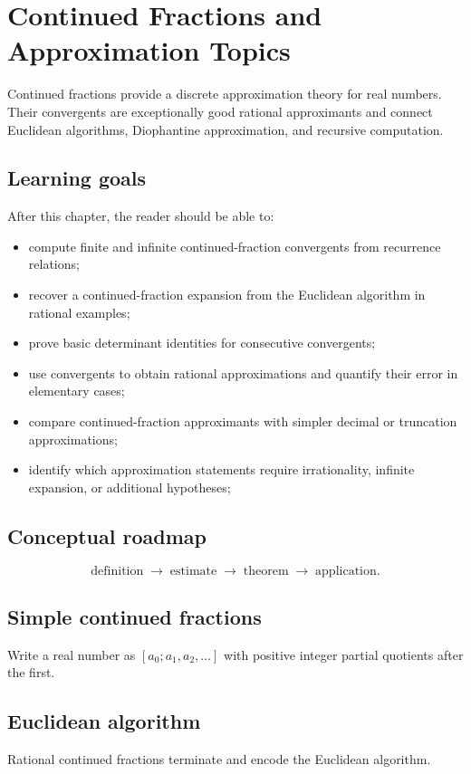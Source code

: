 \chapter{Continued Fractions and Approximation Topics}
\label{ch:ii25}

Continued fractions provide a discrete approximation theory for real numbers. Their convergents are exceptionally good rational approximants and connect Euclidean algorithms, Diophantine approximation, and recursive computation.

\section*{Learning goals}
After this chapter, the reader should be able to:
\begin{itemize}
\item compute finite and infinite continued-fraction convergents from recurrence relations;
\item recover a continued-fraction expansion from the Euclidean algorithm in rational examples;
\item prove basic determinant identities for consecutive convergents;
\item use convergents to obtain rational approximations and quantify their error in elementary cases;
\item compare continued-fraction approximants with simpler decimal or truncation approximations;
\item identify which approximation statements require irrationality, infinite expansion, or additional hypotheses;
\end{itemize}
\section*{Conceptual roadmap}
\[
\boxed{\text{definition}\;\longrightarrow\;\text{estimate}\;\longrightarrow\;\text{theorem}\;\longrightarrow\;\text{application}.}
\]

\section{Simple continued fractions}
Write a real number as $[a_0;a_1,a_2,\ldots]$ with positive integer partial quotients after the first.

\section{Euclidean algorithm}
Rational continued fractions terminate and encode the Euclidean algorithm.

